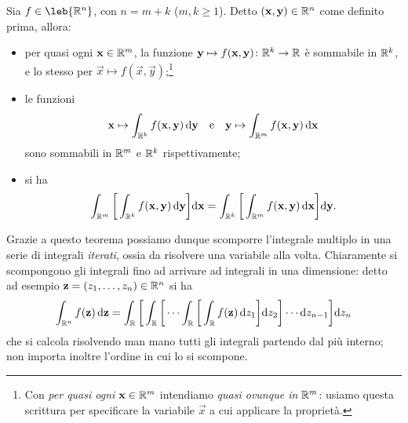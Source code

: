 \begin{teorema}[di Fubini] \label{t:fubini}
	Sia $f\in\leb{\R^n}$, con $n=m+k$ ($m,k\geq 1$).
	Detto $(\mathbf{x},\mathbf{y})\in\mathbb{R}^n$ come definito prima, allora:
	\begin{itemize}
		\item per quasi ogni $\mathbf{x}\in\mathbb{R}^m$, la funzione $\mathbf{y}\mapsto f(\mathbf{x},\mathbf{y})\colon\mathbb{R}^k\to\mathbb{R}$ è sommabile in $\mathbb{R}^k$, e lo stesso per $\vec x\mapsto f(\vec x,\vec y)$;\footnote{Con \emph{per quasi ogni $\mathbf{x}\in\mathbb{R}^m$} intendiamo \emph{quasi ovunque in $\mathbb{R}^m$}: usiamo questa scrittura per specificare la variabile $\vec x$ a cui applicare la proprietà.}
		\item le funzioni
			\begin{equation*}
				\mathbf{x}\mapsto\int_{\mathbb{R}^k}f(\mathbf{x},\mathbf{y})\,\textup{d}\mathbf{y}\quad\text{e}\quad\mathbf{y}\mapsto\int_{\mathbb{R}^m}f(\mathbf{x},\mathbf{y})\,\textup{d}\mathbf{x}
			\end{equation*}
			sono sommabili in $\mathbb{R}^m$ e $\mathbb{R}^k$ rispettivamente;
		\item si ha
			\begin{equation*}
				\int_{\mathbb{R}^m}\bigg[\int_{\mathbb{R}^k}f(\mathbf{x},\mathbf{y})\,\textup{d}\mathbf{y}\bigg]\textup{d}\mathbf{x}=\int_{\mathbb{R}^k}\bigg[\int_{\mathbb{R}^m}f(\mathbf{x},\mathbf{y})\,\textup{d}\mathbf{x}\bigg]\textup{d}\mathbf{y}.
			\end{equation*}
	\end{itemize}
\end{teorema}
Grazie a questo teorema possiamo dunque scomporre l'integrale multiplo in una serie di integrali \emph{iterati}, ossia da risolvere una variabile alla volta.
Chiaramente si scompongono gli integrali fino ad arrivare ad integrali in una dimensione: detto ad esempio $\mathbf{z}=(z_1,\dots,z_n)\in\mathbb{R}^n$ si ha
\begin{equation*}
	\int_{\mathbb{R}^n}f(\mathbf{z})\,\textup{d}\mathbf{z}=\int_{\mathbb{R}}\bigg[\int_{\mathbb{R}}\bigg[\cdots\int_{\mathbb{R}}\bigg[\int_{\mathbb{R}} f(\mathbf{z})\,\textup{d} z_1\bigg]\textup{d} z_2\bigg]\cdots\textup{d} z_{n-1}\bigg]\textup{d} z_n
\end{equation*}
che si calcola risolvendo man mano tutti gli integrali partendo dal più interno; non importa inoltre l'ordine in cui lo si scompone.

